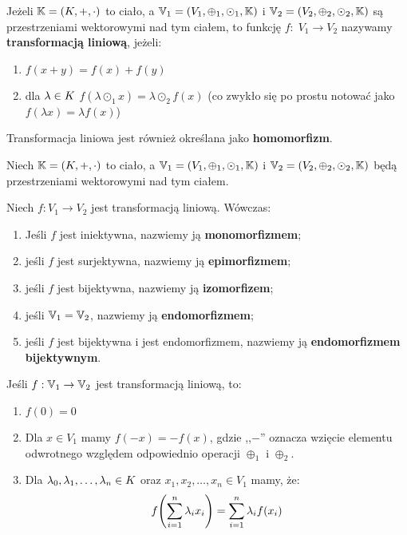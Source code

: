 \begin{definition}
	Jeżeli \(\mathbb{K} = (K, +, \cdot) \) to ciało, a \(\mathbb{V}_1 = (V_1, \oplus_1, \odot_1, \mathbb{K})\) i \( \mathbb{V}_2 = (V_2, \oplus_2, \odot_2, \mathbb{K})\) są przestrzeniami wektorowymi nad tym ciałem, to funkcję \(f: \; V_1 \rightarrow V_2\) nazywamy \textbf{transformacją liniową}, jeżeli:
	\begin{enumerate}
		\item \( f(x+y) = f(x) + f(y) \)
		\item dla \( \lambda \in K \) \(f(\lambda \odot_1 x) = \lambda \odot_2 f(x)\) (co zwykło się po prostu notować jako \( f(\lambda x) = \lambda f(x) \))
	\end{enumerate}

	Transformacja liniowa jest również określana jako \textbf{homomorfizm}.
\end{definition}

\begin{definition}[Morfizmy]
	Niech \(\mathbb{K} = (K, +, \cdot) \) to ciało, a \(\mathbb{V}_1 = (V_1, \oplus_1, \odot_1, \mathbb{K})\) i \( \mathbb{V}_2 = (V_2, \oplus_2, \odot_2, \mathbb{K})\) będą przestrzeniami wektorowymi nad tym ciałem.

	Niech \(f: V_1 \rightarrow V_2\) jest transformacją liniową. Wówczas:

	\begin{enumerate}
		\item Jeśli \(f\) jest iniektywna, nazwiemy ją \textbf{monomorfizmem};
		\item jeśli \(f\) jest surjektywna, nazwiemy ją \textbf{epimorfizmem};
		\item jeśli \(f\) jest bijektywna, nazwiemy ją \textbf{izomorfizem};
		\item jeśli \(\mathbb{V}_1 = \mathbb{V}_2\), nazwiemy ją \textbf{endomorfizmem};
		\item jeśli \(f\) jest bijektywna i jest endomorfizmem, nazwiemy ją \textbf{endomorfizmem bijektywnym}.
	\end{enumerate}
\end{definition}


\begin{fact}
	Jeśli \(f: \mathbb{V}_1 \rightarrow \mathbb{V}_2\) jest transformacją liniową, to:

	\begin{enumerate}
		\item \(f(0) = 0\)
		\item Dla \(x \in V_1\) mamy \(f(-x) = -f(x)\), gdzie ,,\(-\)'' oznacza wzięcie elementu odwrotnego względem odpowiednio operacji \(\oplus_1\) i \(\oplus_2\).
		\item Dla \(\lambda_0, \lambda_1, \dots, \lambda_n \in K\) oraz \(x_1, x_2, \dots, x_n \in V_1\) mamy, że:
		      \[
			      f\pars{\sum_{i=1}^{n} \lambda_i x_i} = \sum_{i=1}^{n} \lambda_i f(x_i)
		      \]
	\end{enumerate}
\end{fact}

